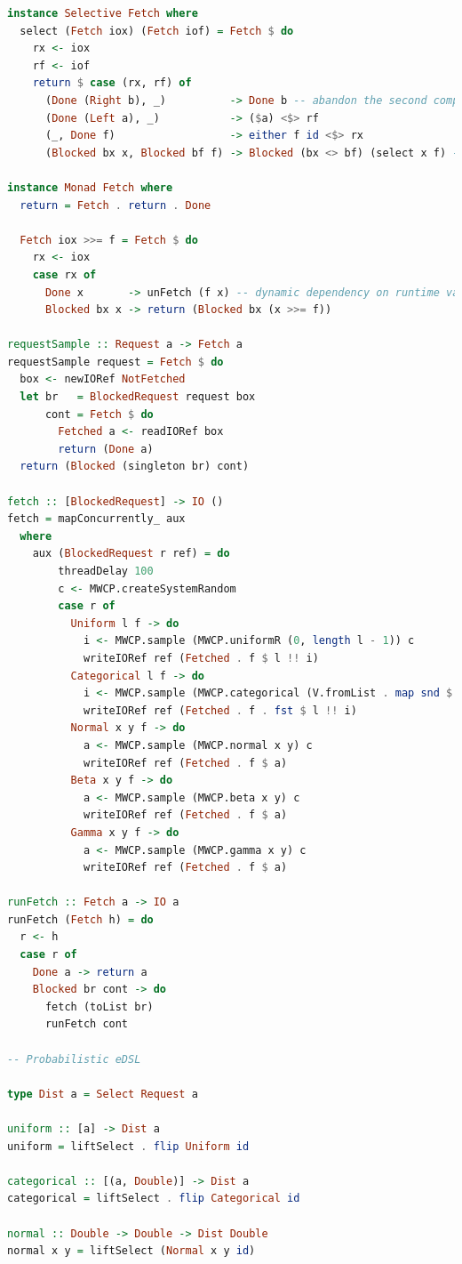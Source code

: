 \documentclass[
  oneside,
  11pt, a4paper,
  footinclude=true,
  headinclude=true,
  cleardoublepage=empty
]{scrbook}
\theoremstyle{definition}
\theoremstyle{definition}
\begin{document}
\begin{lstlisting}[language=Haskell, caption={Selective probabilistic programming library},captionpos=b]
instance Selective Fetch where
  select (Fetch iox) (Fetch iof) = Fetch $ do
    rx <- iox
    rf <- iof
    return $ case (rx, rf) of
      (Done (Right b), _)          -> Done b -- abandon the second computation
      (Done (Left a), _)           -> ($a) <$> rf
      (_, Done f)                  -> either f id <$> rx
      (Blocked bx x, Blocked bf f) -> Blocked (bx <> bf) (select x f) -- speculative execution

instance Monad Fetch where
  return = Fetch . return . Done

  Fetch iox >>= f = Fetch $ do
    rx <- iox
    case rx of
      Done x       -> unFetch (f x) -- dynamic dependency on runtime value 'x'
      Blocked bx x -> return (Blocked bx (x >>= f))

requestSample :: Request a -> Fetch a
requestSample request = Fetch $ do
  box <- newIORef NotFetched
  let br   = BlockedRequest request box
      cont = Fetch $ do
        Fetched a <- readIORef box
        return (Done a)
  return (Blocked (singleton br) cont)

fetch :: [BlockedRequest] -> IO ()
fetch = mapConcurrently_ aux
  where
    aux (BlockedRequest r ref) = do
        threadDelay 100
        c <- MWCP.createSystemRandom
        case r of
          Uniform l f -> do
            i <- MWCP.sample (MWCP.uniformR (0, length l - 1)) c
            writeIORef ref (Fetched . f $ l !! i)
          Categorical l f -> do
            i <- MWCP.sample (MWCP.categorical (V.fromList . map snd $ l)) c
            writeIORef ref (Fetched . f . fst $ l !! i)
          Normal x y f -> do
            a <- MWCP.sample (MWCP.normal x y) c
            writeIORef ref (Fetched . f $ a)
          Beta x y f -> do
            a <- MWCP.sample (MWCP.beta x y) c
            writeIORef ref (Fetched . f $ a)
          Gamma x y f -> do
            a <- MWCP.sample (MWCP.gamma x y) c
            writeIORef ref (Fetched . f $ a)

runFetch :: Fetch a -> IO a
runFetch (Fetch h) = do
  r <- h
  case r of
    Done a -> return a
    Blocked br cont -> do
      fetch (toList br)
      runFetch cont

-- Probabilistic eDSL

type Dist a = Select Request a

uniform :: [a] -> Dist a
uniform = liftSelect . flip Uniform id

categorical :: [(a, Double)] -> Dist a
categorical = liftSelect . flip Categorical id

normal :: Double -> Double -> Dist Double
normal x y = liftSelect (Normal x y id)


\end{lstlisting}
\end{document}
